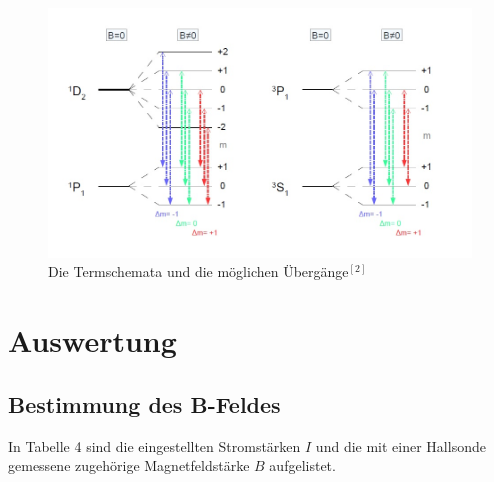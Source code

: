 \documentclass{article}
\begin{document}
	\begin{figure}[H]
		\centering
		\includegraphics[width=0.9\linewidth]{Termschemata.jpg}
		\caption{Die Termschemata und die möglichen Übergänge$^{[2]}$}
		\label{fig:termschemata}
	\end{figure}
	

	
	
	
	
	\section{Auswertung}
	\subsection{Bestimmung des B-Feldes}
	In Tabelle 4 sind die eingestellten Stromstärken $I$ und die mit einer Hallsonde gemessene zugehörige Magnetfeldstärke $B$ aufgelistet. 
	
\end{document}
